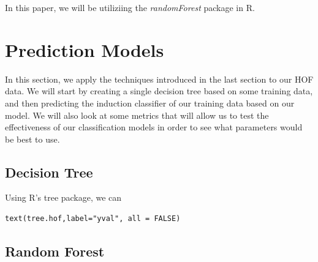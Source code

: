 \documentclass[preprint,12pt]{elsarticle}
\begin{document}
In this paper, we will be utiliziing the \textit{randomForest} package in R. 

\section{Prediction Models}

In this section, we apply the techniques introduced in the last section to our HOF data. We will start by creating a single decision tree based on some training data, and then predicting the induction classifier of our training data based on our model. We will also look at some metrics that will allow us to test the effectiveness of our classification models in order to see what parameters would be best to use. 

\subsection{Decision Tree}
Using R's tree package, we can 

\begin{lstlisting}
text(tree.hof,label="yval", all = FALSE)
\end{lstlisting}


\subsection{Random Forest}



\end{document}
